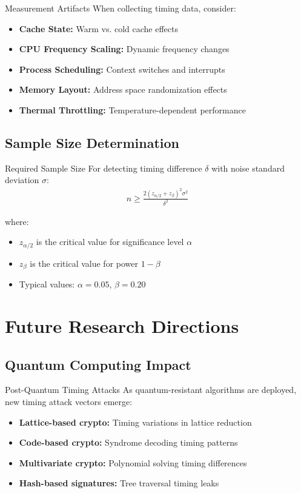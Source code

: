 \documentclass[12pt,a4paper]{article}
\theoremstyle{definition}
\begin{document}
\begin{definitionbox}{Measurement Artifacts}
When collecting timing data, consider:
\begin{itemize}
    \item \textbf{Cache State:} Warm vs. cold cache effects
    \item \textbf{CPU Frequency Scaling:} Dynamic frequency changes
    \item \textbf{Process Scheduling:} Context switches and interrupts
    \item \textbf{Memory Layout:} Address space randomization effects
    \item \textbf{Thermal Throttling:} Temperature-dependent performance
\end{itemize}
\end{definitionbox}

\subsection{Sample Size Determination}

\begin{definitionbox}{Required Sample Size}
For detecting timing difference $\delta$ with noise standard deviation $\sigma$:
\begin{align}
n \geq \frac{2(z_{\alpha/2} + z_{\beta})^2 \sigma^2}{\delta^2}
\end{align}

where:
\begin{itemize}
    \item $z_{\alpha/2}$ is the critical value for significance level $\alpha$
    \item $z_{\beta}$ is the critical value for power $1-\beta$
    \item Typical values: $\alpha = 0.05$, $\beta = 0.20$
\end{itemize}
\end{definitionbox}

\section{Future Research Directions}

\subsection{Quantum Computing Impact}

\begin{definitionbox}{Post-Quantum Timing Attacks}
As quantum-resistant algorithms are deployed, new timing attack vectors emerge:
\begin{itemize}
    \item \textbf{Lattice-based crypto:} Timing variations in lattice reduction
    \item \textbf{Code-based crypto:} Syndrome decoding timing patterns
    \item \textbf{Multivariate crypto:} Polynomial solving timing differences
    \item \textbf{Hash-based signatures:} Tree traversal timing leaks
\end{itemize}
\end{definitionbox}
\end{document}
